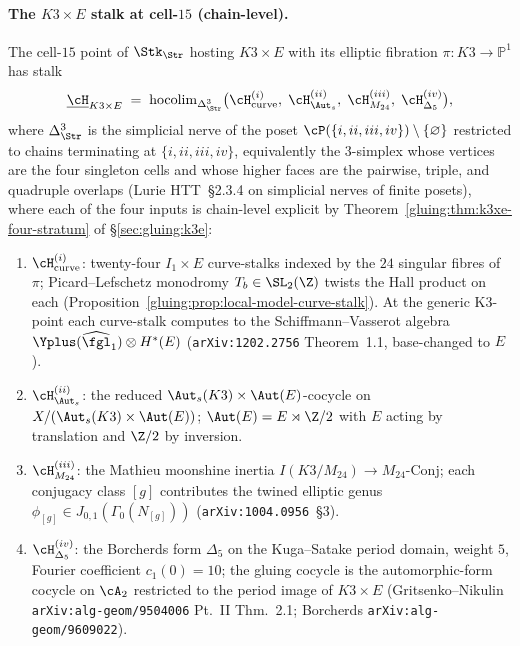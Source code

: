 \paragraph{The $K3\times E$ stalk at cell-$15$ (chain-level).} The
cell-$15$ point of $\Stk_{\Str}$ hosting $K3\times E$ with its
elliptic fibration $\pi:K3\to\mathbb{P}^{1}$ has stalk
\[
\underline{\cH}_{K3\times E}
\;=\;
\mathrm{hocolim}_{\Delta^{3}_{\Str}}
\bigl(\cH^{(i)}_{\mathrm{curve}},\;\cH^{(ii)}_{\Aut_{s}},\;
\cH^{(iii)}_{M_{24}},\;\cH^{(iv)}_{\Delta_{5}}\bigr),
\]
where $\Delta^{3}_{\Str}$ is the simplicial nerve of the poset
$\cP(\{i,ii,iii,iv\})\setminus\{\varnothing\}$ restricted to chains
terminating at $\{i,ii,iii,iv\}$, equivalently the $3$-simplex whose
vertices are the four singleton cells and whose higher faces are the
pairwise, triple, and quadruple overlaps (Lurie HTT~\S 2.3.4 on
simplicial nerves of finite posets),
where each of the four inputs is chain-level explicit by
Theorem~\ref{gluing:thm:k3xe-four-stratum} of \S\ref{sec:gluing:k3e}:
\begin{enumerate}[label=\textup{(\alph*)}]
 \item $\cH^{(i)}_{\mathrm{curve}}$: twenty-four $I_{1}\times E$
 curve-stalks indexed by the $24$ singular fibres of $\pi$;
 Picard--Lefschetz monodromy $T_{b}\in\SL_{2}(\Z)$ twists the Hall
 product on each (Proposition~\ref{gluing:prop:local-model-curve-stalk}).
 At the generic K3-point each curve-stalk computes to the
 Schiffmann--Vasserot algebra $\Yplus(\widehat{\fgl}_{1})\otimes H^{*}(E)$
 (\texttt{arXiv:1202.2756} Theorem~1.1, base-changed to $E$).
 \item $\cH^{(ii)}_{\Aut_{s}}$: the reduced
 $\Aut_{s}(K3)\times\Aut(E)$-cocycle on
 $X/(\Aut_{s}(K3)\times\Aut(E))$; $\Aut(E)=E\rtimes\Z/2$ with $E$
 acting by translation and $\Z/2$ by inversion.
 \item $\cH^{(iii)}_{M_{24}}$: the Mathieu moonshine inertia
 $I(K3/M_{24})\to M_{24}\mathrm{\text{-}Conj}$; each conjugacy class
 $[g]$ contributes the twined elliptic genus
 $\phi_{[g]}\in J_{0,1}(\Gamma_{0}(N_{[g]}))$
 (\texttt{arXiv:1004.0956}~\S 3).
 \item $\cH^{(iv)}_{\Delta_{5}}$: the Borcherds form $\Delta_{5}$ on
 the Kuga--Satake period domain, weight $5$, Fourier coefficient
 $c_{1}(0)=10$; the gluing cocycle is the automorphic-form cocycle
 on $\cA_{2}$ restricted to the period image of $K3\times E$
 (Gritsenko--Nikulin \texttt{arXiv:alg-geom/9504006} Pt.~II Thm.~2.1;
 Borcherds \texttt{arXiv:alg-geom/9609022}).
\end{enumerate}
